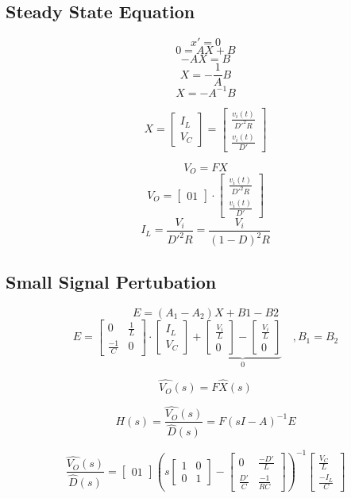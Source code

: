 \subsection{Steady State Equation}

\[ x' = 0 \]
\[ 0 = AX + B \]
\[ -AX = B \]
\[ X = -\frac{1}{A}B \]
\[ X = -A^{-1}B \]

\[
	X
	=
	\begin{bmatrix}
		I_L \\
		V_C
	\end{bmatrix}
	=
	\begin{bmatrix}
		\frac{v_i(t)}{D'^2 R} \\
		\frac{v_i(t)}{D'}
	\end{bmatrix}
\]

\[ V_O = F X \]
\[
	V_O
	= 
	\begin{bmatrix}
		0 1
	\end{bmatrix}
	\cdot
	\begin{bmatrix}
		\frac{v_i(t)}{D'^2 R} \\
		\frac{v_i(t)}{D'}
	\end{bmatrix}
\]
\[
	I_L
	= \frac{V_i}{D'^2 R}
	= \frac{V_i}{(1-D)^2 R}
\]

\subsection{Small Signal Pertubation}
\[	E = (A_1 - A_2)X + B1 - B2 \]
\[
	E =
	\begin{bmatrix}
		0 & \frac{1}{L} \\
		\frac{-1}{C} & 0
	\end{bmatrix}
	\cdot
	\begin{bmatrix}
		I_L \\
		V_C
	\end{bmatrix}
	+ \underbrace{
	\begin{bmatrix}
		\frac{V_i}{L} \\
		0
	\end{bmatrix}
	-
	\begin{bmatrix}
		\frac{V_i}{L} \\
		0
	\end{bmatrix}}_{0}
	\quad, B_1 = B_2
\]

\[
	\hat{V_O}(s) = F\hat{X}(s)
\]

\[
	H(s)
	= \frac{\hat{V_O}(s)}{\hat{D}(s)}
	= F ( s I - A )^{-1} E
\]

\[
	\frac{\hat{V_O}(s)}{\hat{D}(s)}
	=
	\begin{bmatrix}
		0 1
	\end{bmatrix}
	\left( s 
	\begin{bmatrix}
		1 & 0 \\
		0 & 1
	\end{bmatrix}
	-
	\begin{bmatrix}
		0 & \frac{-D'}{L} \\
		\frac{D'}{C} & \frac{-1}{R C}
	\end{bmatrix}
	\right)^{-1}
	\begin{bmatrix}
		\frac{V_C}{L} \\
		\frac{-I_L}{C}
	\end{bmatrix}
\]

